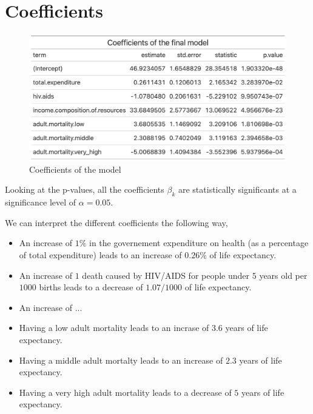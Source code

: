 \section{Coefficients}

\begin{figure}[H]
	\centering
	\includegraphics{figures/coefficients/coeff-model.png}
	\caption{Coefficients of the model}
	\label{fig:coeff-model}
\end{figure}

Looking at the p-values, all the coefficients $\beta_k$ are statistically significants at a significance level of $\alpha = 0.05$.

We can interpret the different coefficients the following way,
\begin{itemize}
	\item An increase of $1\%$ in the governement expenditure on health (as a percentage of total expenditure) leads to an increase of $0.26\%$ of life expectancy.
	\item An increase of $1$ death caused by HIV/AIDS for people under $5$ years old per $1000$ births leads to a decrease of $1.07/1000$ of life expectancy.
	\item An increase of ...
	\item Having a low adult mortality leads to an incrase of $3.6$ years of life expectancy.
	\item Having a middle adult mortalty leads to an increase of $2.3$ years of life expectancy.
	\item Having a very high adult mortality leads to a decrease of $5$ years of life expectancy.
\end{itemize}